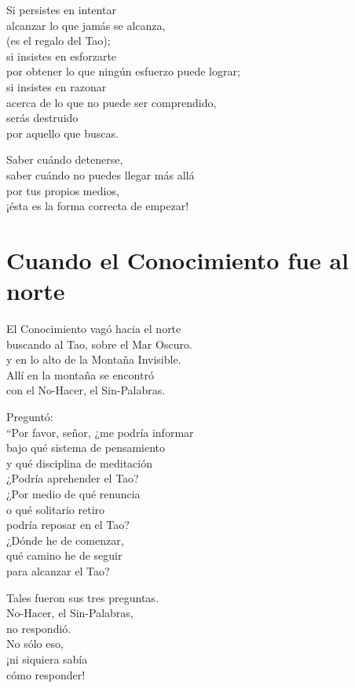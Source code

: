 \documentclass[hidelinks]{memoir}
\begin{document}
	Si persistes en intentar\\
	alcanzar lo que jamás se alcanza,\\
	(es el regalo del Tao);\\
	si insistes en esforzarte\\
	por obtener lo que ningún esfuerzo puede lograr;\\
	si insistes en razonar\\
	acerca de lo que no puede ser comprendido,\\
	serás destruido\\
	por aquello que buscas.
	
	Saber cuándo detenerse,\\
	saber cuándo no puedes llegar más allá\\
	por tus propios medios,\\
	¡ésta es la forma correcta de empezar!
	
	\chapter*{Cuando el Conocimiento fue al norte}
	
	El Conocimiento vagó hacia el norte\\
	buscando al Tao, sobre el Mar Oscuro.\\
	y en lo alto de la Montaña Invisible.\\
	Allí en la montaña se encontró\\
	con el No-Hacer, el Sin-Palabras.
	
	Preguntó:\\
	``Por favor, señor, ¿me podría informar\\
	bajo qué sistema de pensamiento\\
	y qué disciplina de meditación\\
	¿Podría aprehender el Tao?\\
	¿Por medio de qué renuncia\\
	o qué solitario retiro\\
	podría reposar en el Tao?\\
	¿Dónde he de comenzar,\\
	qué camino he de seguir\\
	para alcanzar el Tao?
	
	Tales fueron sus tres preguntas.\\
	No-Hacer, el Sin-Palabras,\\
	no respondió.\\
	No sólo eso,\\
	¡ni siquiera sabía\\
	cómo responder!
	
\end{document}
